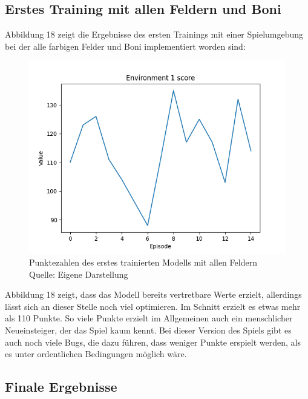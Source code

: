 \subsection{Erstes Training mit allen Feldern und Boni}
Abbildung 18 zeigt die Ergebnisse des ersten Trainings mit einer Spielumgebung bei der alle farbigen Felder und Boni implementiert worden sind:
\nopagebreak
\begin{figure}[H]
	\includegraphics[width=1\textwidth]{Bilder/firsttrainingwithallfields} 
	\caption[Punktezahlen des erstes trainierten Modells mit allen Feldern]{Punktezahlen des erstes trainierten Modells mit allen Feldern\\ Quelle: Eigene Darstellung}
\end{figure}

Abbildung 18 zeigt, dass das Modell bereits vertretbare Werte erzielt, allerdings lässt sich an dieser Stelle noch viel optimieren. Im Schnitt erzielt es etwas mehr als 110 Punkte. So viele Punkte erzielt im Allgemeinen auch ein menschlicher Neueinsteiger, der das Spiel kaum kennt. Bei dieser Version des Spiels gibt es auch noch viele Bugs, die dazu führen, dass weniger Punkte erspielt werden, als es unter ordentlichen Bedingungen möglich wäre.
\subsection{Finale Ergebnisse}
